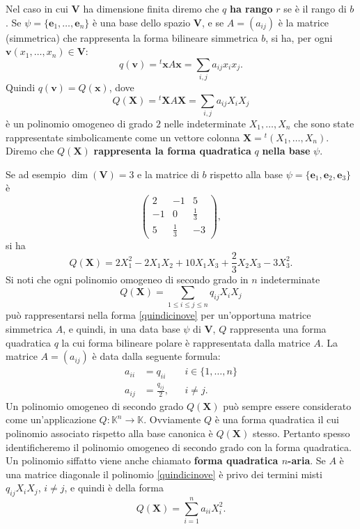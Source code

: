 \documentclass{article}
\theoremstyle{plain}
\theoremstyle{definition}
\theoremstyle{remark}
\begin{document}
Nel caso in cui $\mathbf{V}$ ha dimensione finita diremo che $q$ \textbf{ha rango} $r$ se è il rango di $b$.
Se $\psi=\{\mathbf{e}_1,\ldots,\mathbf{e}_n\}$ è una base dello spazio $\mathbf{V}$, e se $A = (a_{ij})$ è la matrice 
(simmetrica) che rappresenta la forma bilineare simmetrica $b$, si ha, per ogni 
$\mathbf{v}(x_1, \ldots, x_n) \in \mathbf{V}$:
\[q(\mathbf{v}) = {}^t\mathbf{x} A \mathbf{x} = \sum_{i,j} a_{ij} x_i x_j.\]
Quindi $q(\mathbf{v}) = Q(\mathbf{x})$, dove
\begin{equation}\label{quindicinove}
Q(\mathbf{X}) = {}^t\mathbf{X} A \mathbf{X} = \sum_{i,j} a_{ij} X_i X_j 
\end{equation}
è un polinomio omogeneo di grado $2$ nelle indeterminate $X_1, \ldots, X_n$ che sono 
state rappresentate simbolicamente come un vettore colonna $\mathbf{X} = {}^t(X_1, \ldots, X_n)$.
Diremo che $Q(\mathbf{X})$ \textbf{rappresenta la forma quadratica} $q$ \textbf{nella base} $\psi$.

\vspace{10pt}

Se ad esempio $\dim(\mathbf{V})=3$ e la matrice di $b$ rispetto alla base $\psi=\{\mathbf{e}_1, \mathbf{e}_2, \mathbf{e}_3\}$ è
\begin{equation}
\begin{pmatrix}
2 & -1 & 5 \\
-1 & 0 & \frac{1}{3} \\
5 & \frac{1}{3} & -3
\end{pmatrix},
\end{equation}
si ha
\begin{equation}
Q(\mathbf{X}) = 2X_1^2 - 2X_1 X_2 + 10X_1 X_3 + \frac{2}{3} X_2 X_3 - 3X_3^2.
\end{equation}
Si noti che ogni polinomio omogeneo di secondo grado in $n$ indeterminate
\[Q(\mathbf{X}) = \sum_{1 \leq i \leq j \leq n} q_{ij} X_i X_j\]
può rappresentarsi nella forma \ref{quindicinove} per un'opportuna matrice simmetrica $A$,
e quindi, in una data base $\psi$ di $\mathbf{V}$, $Q$ rappresenta una forma quadratica $q$ la cui 
forma bilineare polare è rappresentata dalla matrice $A$. La matrice $A = (a_{ij})$ è data 
dalla seguente formula:
\begin{align*}
a_{ii} &= q_{ii} && i \in \{1, \ldots, n\} \\
a_{ij} &= \frac{q_{ij}}{2}, && i \neq j.
\end{align*}
Un polinomio omogeneo di secondo grado $Q(\mathbf{X})$ può sempre essere considerato come un'applicazione $Q: \mathbb{K}^n \to \mathbb{K}$. 
Ovviamente $Q$ è una forma quadratica il cui polinomio associato rispetto alla base canonica è 
$Q(\mathbf{X})$ stesso. Pertanto spesso identificheremo il polinomio omogeneo di secondo grado con la forma quadratica. Un polinomio
siffatto viene anche chiamato \textbf{forma quadratica $n$-aria}.
Se $A$ è una matrice diagonale il polinomio \ref{quindicinove} è privo dei termini misti $q_{ij}X_iX_j$, $i \neq j$, 
e quindi è della forma
\begin{equation}\label{quindicidieci}
Q(\mathbf{X}) = \sum_{i=1}^{n}a_{ii}X_i^2. 
\end{equation}
\end{document}
